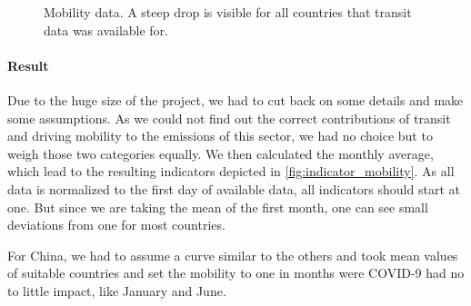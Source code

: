 \begin{figure}[h!]
	\centering
	\hfill
	\caption{Mobility data. A steep drop is visible for all countries that transit data was available for.}
	\label{fig:transit}
\end{figure}

\paragraph{Result}

Due to the huge size of the project, we had to cut back on some details and make some assumptions. As we could not find out the correct contributions of transit and driving mobility to the \co emissions of this sector, we had no choice but to weigh those two categories equally. We then calculated the monthly average, which lead to the resulting indicators depicted in \autoref{fig:indicator_mobility}. As all data is normalized to the first day of available data, all indicators should start at one. But since we are taking the mean of the first month, one can see small deviations from one for most countries.

For China, we had to assume a curve similar to the others and took mean values of suitable countries and set the mobility to one in months were COVID-9 had no to little impact, like January and June.


